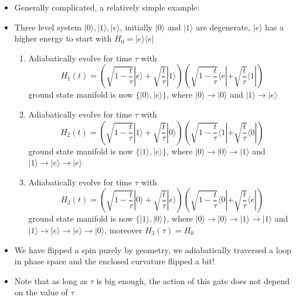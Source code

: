 \documentclass[english]{article}
\newcommand{\bra}[1]{\langle#1 |}
\newcommand{\ket}[1]{|#1 \rangle}
\newcommand{\ketbra}[2]{\vert #1 \rangle \! \langle #2 \vert}
\begin{document}
\begin{itemize}
\begin{itemize}
\item Generally complicated, a relatively simple example:
\item Three level system $\ket{0},\ket{1},\ket{e}$, initially $\ket{0}$ and $\ket{1}$ are degenerate, $\ket{e}$ has a higher energy to start with $H_0=\ketbra{e}{e}$
\begin{enumerate}
\item Adiabatically evolve for time $\tau$ with
\begin{equation}
H_1(t)=\left(\sqrt{1-\frac{t}{\tau}}\ket{e}+\sqrt{\frac{t}{\tau}}\ket{1}\right)\left(\sqrt{1-\frac{t}{\tau}}\bra{e}+\sqrt{\frac{t}{\tau}}\bra{1}\right)
\end{equation}
 ground state manifold is now $\{\ket{0},\ket{e}\}$, where $\ket{0}\rightarrow \ket{0}$ and $\ket{1}\rightarrow \ket{e}$
 \item Adiabatically evolve for time $\tau$ with
\begin{equation}
H_2(t)=\left(\sqrt{1-\frac{t}{\tau}}\ket{1}+\sqrt{\frac{t}{\tau}}\ket{0}\right)\left(\sqrt{1-\frac{t}{\tau}}\bra{1}+\sqrt{\frac{t}{\tau}}\bra{0}\right)
\end{equation}
 ground state manifold is now $\{\ket{1},\ket{e}\}$, where $\ket{0}\rightarrow \ket{0}\rightarrow \ket{1}$ and $\ket{1}\rightarrow \ket{e} \rightarrow \ket{e}$
 \item Adiabatically evolve for time $\tau$ with
\begin{equation}
H_3(t)=\left(\sqrt{1-\frac{t}{\tau}}\ket{0}+\sqrt{\frac{t}{\tau}}\ket{e}\right)\left(\sqrt{1-\frac{t}{\tau}}\bra{0}+\sqrt{\frac{t}{\tau}}\bra{e}\right)
\end{equation}
 ground state manifold is now $\{\ket{1},\ket{0}\}$, where $\ket{0}\rightarrow \ket{0}\rightarrow \ket{1}\rightarrow \ket{1}$ and $\ket{1}\rightarrow \ket{e} \rightarrow \ket{e}\rightarrow \ket{0}$, moreover $H_3(\tau)=H_0$
\end{enumerate}
\item We have flipped a spin purely by geometry, we adiabatically traversed a loop in phase space and the enclosed curvature flipped a bit!
\item Note that as long as $\tau$ is big enough, the action of this gate does not depend on the value of $\tau$
\end{itemize}
\end{itemize}
\end{document}

